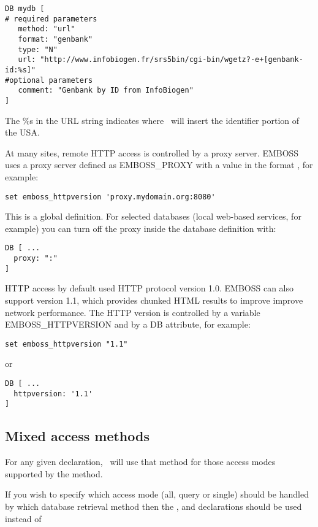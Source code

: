 \documentclass{report}
\begin{document}
\begin{verbatim}
DB mydb [
# required parameters
   method: "url"
   format: "genbank"
   type: "N"
   url: "http://www.infobiogen.fr/srs5bin/cgi-bin/wgetz?-e+[genbank-id:%s]"
#optional parameters
   comment: "Genbank by ID from InfoBiogen"
]
\end{verbatim}

The \%s in the URL string indicates where \EMBOSS\ will insert the
identifier portion of the USA.

At many sites, remote HTTP access is controlled by a proxy
server. EMBOSS uses a proxy server defined as EMBOSS\_PROXY with a
value in the format , for example:

\begin{verbatim}
set emboss_httpversion 'proxy.mydomain.org:8080'
\end{verbatim}

This is a global definition. For selected databases (local web-based
services, for example) you can turn off the proxy inside the database
definition with:

\begin{verbatim}
DB [ ...
  proxy: ":"
]
\end{verbatim}

HTTP access by default used HTTP protocol version 1.0. EMBOSS can also
support version 1.1, which provides chunked HTML results to improve
improve network performance. The HTTP version is controlled by a
variable EMBOSS\_HTTPVERSION and by a DB attribute, for example:

\begin{verbatim}
set emboss_httpversion "1.1"
\end{verbatim}

or

\begin{verbatim}
DB [ ...
  httpversion: '1.1'
]
\end{verbatim}

\subsection{Mixed access methods}

For any given  declaration, \EMBOSS\ will use that
method for those access modes supported by the method.

If you wish to specify which access mode (all, query or single) should
be handled by which database retrieval method then the
,  and 
declarations should be used instead of 
\end{document}
